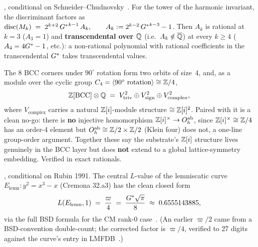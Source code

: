 , conditional on
Schneider--Chudnovsky~\cite{schneider1937,chudnovsky1984}. For the
tower of the harmonic invariant, the discriminant factors as $\operatorname{disc}(M_k) \;=\; 2^{k+2}\,{G^{*}}^{k-1}\,A_k, \qquad A_k := 2^{k-2}\,{G^{*}}^{k-3} - 1$. Then
$A_k$ is rational at $k=3$ ($A_3=1$) and \textbf{transcendental over $\mathbb{Q}$} (i.e.\
$A_k\notin\overline{\mathbb{Q}}$) at every $k\ge4$ ($A_4=4G^{*}-1$, etc.): a non-rational
polynomial with rational coefficients in the transcendental $G^{*}$ takes
transcendental values.

 The 8 BCC corners under $90^\circ$
rotation form two orbits of size~4, and, as a module over the cyclic group
$C_4=\langle 90^\circ\text{ rotation}\rangle\cong\mathbb{Z}/4$,
\[ \mathbb{Z}[\mathrm{BCC}] \otimes \mathbb{Q} \;=\; V_{\mathrm{triv}}^{2} \oplus V_{\mathrm{sign}}^{2} \oplus V_{\mathrm{complex}}^{2}, \]
where $V_{\mathrm{complex}}$ carries a natural $\mathbb{Z}[i]$-module structure
$\cong\mathbb{Z}[i]^2$. Paired with it is a clean no-go: there is \textbf{no} injective
homomorphism $\mathbb{Z}[i]^{\times}\to O_h^{\mathrm{ab}}$, since $\mathbb{Z}[i]^{\times}\cong\mathbb{Z}/4$ has an order-4
element but $O_h^{\mathrm{ab}}\cong\mathbb{Z}/2\times\mathbb{Z}/2$ (Klein four) does
not, a one-line group-order argument. Together these say the substrate's
$\mathbb{Z}[i]$ structure lives genuinely in the BCC layer but does \textbf{not} extend to a
global lattice-symmetry embedding. Verified in exact rationals.

, conditional on Rubin 1991. The
central $L$-value of the lemniscatic curve $E_{\mathrm{lemn}}:y^2=x^3-x$ (Cremona
32.a3) has the clean closed form
\[ L(E_{\mathrm{lemn}}, 1) \;=\; \frac{\varpi}{4} \;=\; \frac{G^{*}\sqrt\pi}{8} \;\approx\; 0.6555143885, \]
via the full BSD formula for the CM rank-0 case~\cite{rubin1991}. (An earlier
$\varpi/2$ came from a BSD-convention double-count; the corrected factor is
$\varpi/4$, verified to 27 digits against the curve's entry in
LMFDB~\cite{lmfdb}.)

